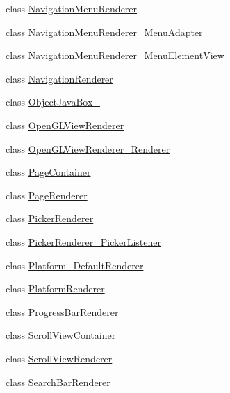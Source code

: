 \begin{CompactItemize}
\item 
class \hyperlink{classmd5b60ffeb829f638581ab2bb9b1a7f4f3f_1_1_navigation_menu_renderer}{NavigationMenuRenderer}
\item 
class \hyperlink{classmd5b60ffeb829f638581ab2bb9b1a7f4f3f_1_1_navigation_menu_renderer___menu_adapter}{NavigationMenuRenderer\_\-MenuAdapter}
\item 
class \hyperlink{classmd5b60ffeb829f638581ab2bb9b1a7f4f3f_1_1_navigation_menu_renderer___menu_element_view}{NavigationMenuRenderer\_\-MenuElementView}
\item 
class \hyperlink{classmd5b60ffeb829f638581ab2bb9b1a7f4f3f_1_1_navigation_renderer}{NavigationRenderer}
\item 
class \hyperlink{classmd5b60ffeb829f638581ab2bb9b1a7f4f3f_1_1_object_java_box__1}{ObjectJavaBox\_}
\item 
class \hyperlink{classmd5b60ffeb829f638581ab2bb9b1a7f4f3f_1_1_open_g_l_view_renderer}{OpenGLViewRenderer}
\item 
class \hyperlink{classmd5b60ffeb829f638581ab2bb9b1a7f4f3f_1_1_open_g_l_view_renderer___renderer}{OpenGLViewRenderer\_\-Renderer}
\item 
class \hyperlink{classmd5b60ffeb829f638581ab2bb9b1a7f4f3f_1_1_page_container}{PageContainer}
\item 
class \hyperlink{classmd5b60ffeb829f638581ab2bb9b1a7f4f3f_1_1_page_renderer}{PageRenderer}
\item 
class \hyperlink{classmd5b60ffeb829f638581ab2bb9b1a7f4f3f_1_1_picker_renderer}{PickerRenderer}
\item 
class \hyperlink{classmd5b60ffeb829f638581ab2bb9b1a7f4f3f_1_1_picker_renderer___picker_listener}{PickerRenderer\_\-PickerListener}
\item 
class \hyperlink{classmd5b60ffeb829f638581ab2bb9b1a7f4f3f_1_1_platform___default_renderer}{Platform\_\-DefaultRenderer}
\item 
class \hyperlink{classmd5b60ffeb829f638581ab2bb9b1a7f4f3f_1_1_platform_renderer}{PlatformRenderer}
\item 
class \hyperlink{classmd5b60ffeb829f638581ab2bb9b1a7f4f3f_1_1_progress_bar_renderer}{ProgressBarRenderer}
\item 
class \hyperlink{classmd5b60ffeb829f638581ab2bb9b1a7f4f3f_1_1_scroll_view_container}{ScrollViewContainer}
\item 
class \hyperlink{classmd5b60ffeb829f638581ab2bb9b1a7f4f3f_1_1_scroll_view_renderer}{ScrollViewRenderer}
\item 
class \hyperlink{classmd5b60ffeb829f638581ab2bb9b1a7f4f3f_1_1_search_bar_renderer}{SearchBarRenderer}

\end{CompactItemize}

